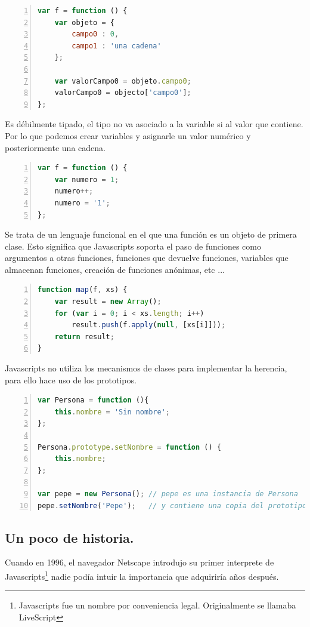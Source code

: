 \begin{lstlisting}[language=JavaScript, numbers=left]
var f = function () {
	var objeto = { 
		campo0 : 0,
		campo1 : 'una cadena' 
	};
	
	var valorCampo0 = objeto.campo0;
	valorCampo0 = objecto['campo0'];
};
\end{lstlisting}

Es débilmente tipado, el tipo no va asociado a la variable si al valor que contiene. Por lo que podemos crear variables y asignarle un valor numérico y posteriormente una cadena. 

\begin{lstlisting}[language=JavaScript, numbers=left]
var f = function () {
	var numero = 1;
	numero++;
	numero = '1';
};
\end{lstlisting}

Se trata de un lenguaje funcional en el que una función es un objeto de primera clase. Esto significa que Javascripts soporta el paso de funciones como argumentos a otras funciones, funciones que devuelve funciones, variables que almacenan funciones, creación de funciones anónimas, etc ...

\begin{lstlisting}[language=JavaScript, numbers=left]
function map(f, xs) {
	var result = new Array();
	for (var i = 0; i < xs.length; i++)
		result.push(f.apply(null, [xs[i]]));
	return result;
}
\end{lstlisting}

Javascripts no utiliza los mecanismos de clases para implementar la herencia, para ello hace uso de los prototipos. 

\begin{lstlisting}[language=JavaScript, numbers=left]
var Persona = function (){
	this.nombre = 'Sin nombre';
};

Persona.prototype.setNombre = function () {
	this.nombre;
};

var pepe = new Persona(); // pepe es una instancia de Persona 
pepe.setNombre('Pepe');   // y contiene una copia del prototipo de Persona.
\end{lstlisting}


\subsection{Un poco de historia.}

Cuando en 1996, el navegador Netscape introdujo su primer interprete de
Javascripts\footnote{Javascripts fue un nombre por conveniencia legal. Originalmente se llamaba
  LiveScript} nadie podía intuir la importancia que adquiriría años después. 

